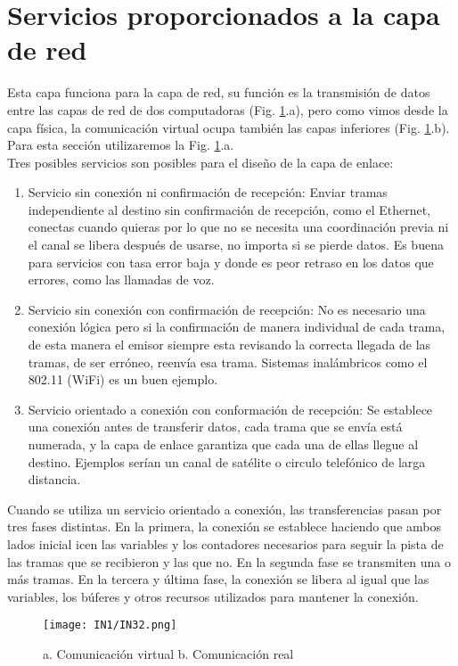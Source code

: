 \documentclass[
	12pt, %
	fleqn, %
	a4paper, %
]{LegrandOrangeBook}
\begin{document}
\section{Servicios proporcionados a la capa de red}
Esta capa funciona para la capa de red, su función es la transmisión de datos entre las capas de red de dos computadoras (Fig. \ref{fig: comuncacion virtual}.a), pero como vimos desde la capa física, la comunicación virtual ocupa también las capas inferiores (Fig. \ref{fig: comuncacion virtual}.b). Para esta sección utilizaremos la Fig. \ref{fig: comuncacion virtual}.a.\\
Tres posibles servicios son posibles para el diseño de la capa de enlace:
\begin{enumerate}
\item Servicio sin conexión ni confirmación de recepción: Enviar tramas independiente al destino sin confirmación de recepción, como el Ethernet, conectas cuando quieras por lo que no se necesita una coordinación previa ni el canal se libera después de usarse, no importa si se pierde datos. Es buena para servicios con tasa error baja y donde es peor retraso en los datos que errores, como las llamadas de voz.
\item Servicio sin conexión con confirmación de recepción: No es necesario una conexión lógica pero si la confirmación de manera individual de cada trama, de esta manera el emisor siempre esta revisando la correcta llegada de las tramas, de ser erróneo, reenvía esa trama. Sistemas inalámbricos como el 802.11 (WiFi) es un buen ejemplo.
\item Servicio orientado a conexión con conformación de recepción: Se establece una conexión antes de transferir datos, cada trama que se envía está numerada, y la capa de enlace garantiza que cada una de ellas llegue al destino. Ejemplos serían un canal de satélite o circulo telefónico de larga distancia.
\end{enumerate}
Cuando se utiliza un servicio orientado a conexión, las transferencias pasan por tres fases distintas. En la primera, la conexión se establece haciendo que ambos lados inicial icen las variables y los contadores necesarios para seguir la pista de las tramas que se recibieron y las que no. En la segunda fase se transmiten una o más tramas. En la tercera y última fase, la conexión se libera al igual que las variables, los búferes y otros recursos utilizados para mantener la conexión.
\begin{figure}[]
\centering
\texttt{[image: IN1/IN32.png]}
\caption{a. Comunicación virtual b. Comunicación real}
\label{fig: comuncacion virtual}
\end{figure}
\end{document}
